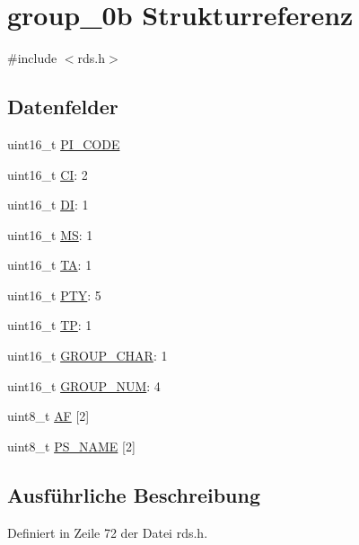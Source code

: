 \hypertarget{structgroup__0b}{}\section{group\+\_\+0b Strukturreferenz}
\label{structgroup__0b}


{\ttfamily \#include $<$rds.\+h$>$}

\subsection*{Datenfelder}
\begin{DoxyCompactItemize}
\item 
uint16\+\_\+t \hyperlink{structgroup__0b_a5cd9b1f6413028425796c1129aa8fd87}{P\+I\+\_\+\+C\+O\+D\+E}
\item 
uint16\+\_\+t \hyperlink{structgroup__0b_aa6fd8556e02ce89fed23057f1cb37e44}{C\+I}\+: 2
\item 
uint16\+\_\+t \hyperlink{structgroup__0b_ad020d0abff338c9c34924a44478ac591}{D\+I}\+: 1
\item 
uint16\+\_\+t \hyperlink{structgroup__0b_a0d87191040df43fdd9f67487d0cc1a45}{M\+S}\+: 1
\item 
uint16\+\_\+t \hyperlink{structgroup__0b_a6de7751205cef4ffcce610399a030892}{T\+A}\+: 1
\item 
uint16\+\_\+t \hyperlink{structgroup__0b_a0474967478fbbc2c71b800d2e0132d45}{P\+T\+Y}\+: 5
\item 
uint16\+\_\+t \hyperlink{structgroup__0b_ab9e634c63b0d95a96716d5f6d7f06d72}{T\+P}\+: 1
\item 
uint16\+\_\+t \hyperlink{structgroup__0b_a66d4119990dc4c3e040a43885e9bb953}{G\+R\+O\+U\+P\+\_\+\+C\+H\+A\+R}\+: 1
\item 
uint16\+\_\+t \hyperlink{structgroup__0b_a9f692e9f76ee88348d426bcd4e9bc70b}{G\+R\+O\+U\+P\+\_\+\+N\+U\+M}\+: 4
\item 
uint8\+\_\+t \hyperlink{structgroup__0b_ae5a8515ae995b21e542b2ad52b20c34e}{A\+F} \mbox{[}2\mbox{]}
\item 
uint8\+\_\+t \hyperlink{structgroup__0b_a80447425671c19133df16d620705bb09}{P\+S\+\_\+\+N\+A\+M\+E} \mbox{[}2\mbox{]}
\end{DoxyCompactItemize}


\subsection{Ausführliche Beschreibung}


Definiert in Zeile 72 der Datei rds.\+h.



